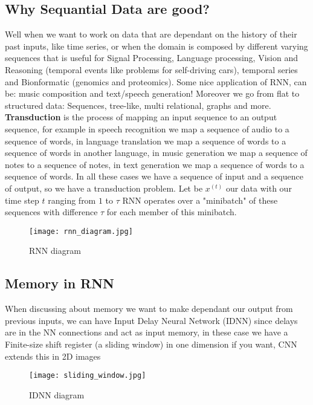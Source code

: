 \documentclass[12pt]{book}
\begin{document}
\subsection{Why Sequantial Data are good?}
Well when we want to work on data that are dependant on the history of their past inputs, like time series, or when the domain is composed by different varying sequences that is useful for Signal Processing, Language processing, Vision and Reasoning (temporal events like problems for self-driving cars), temporal series and Bionformatic (genomics and proteomics). Some nice application of RNN, can be: music composition and text/speech generation!\newline
Moreover we go from flat to structured data: Sequences, tree-like, multi relational, graphs and more.\newline
\textbf{Transduction} is the process of mapping an input sequence to an output sequence, for example in speech recognition we map a sequence of audio to a sequence of words, in language translation we map a sequence of words to a sequence of words in another language, in music generation we map a sequence of notes to a sequence of notes, in text generation we map a sequence of words to a sequence of words. In all these cases we have a sequence of input and a sequence of output, so we have a transduction problem.\newline
Let be $x^{(t)}$ our data with our time step $t$ ranging from $1$ to $\tau$ RNN operates over a "minibatch" of these sequences with difference $\tau$ for each member of this minibatch.

\begin{figure}[h]
	\centering
	\texttt{[image: rnn\_diagram.jpg]}
	\caption{RNN diagram}
	\label{fig:rnn_diagram}
\end{figure}

\subsection{Memory in RNN}
When discussing about memory we want to make dependant our output from previous inputs, we can have Input Delay Neural Network (IDNN) since delays are in the NN connections and act as input memory, in these case we have a Finite-size shift register (a sliding window) in one dimension if you want, CNN extends this in 2D images

\begin{figure}[h]
	\centering
	\texttt{[image: sliding\_window.jpg]}
	\caption{IDNN diagram}
	\label{fig:idnn_diagram}
\end{figure}
\end{document}
